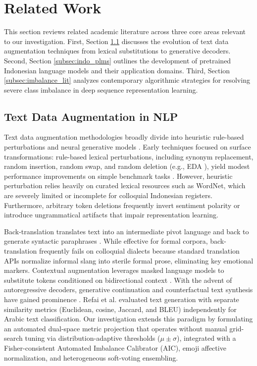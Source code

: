\documentclass{ieeeaccess}
\begin{document}
\section{Related Work}
\label{sec:related_work}

This section reviews related academic literature across three core areas relevant to our investigation. First, Section \ref{subsec:text_aug} discusses the evolution of text data augmentation techniques from lexical substitutions to generative decoders. Second, Section \ref{subsec:indo_plms} outlines the development of pretrained Indonesian language models and their application domains. Third, Section \ref{subsec:imbalance_lit} analyzes contemporary algorithmic strategies for resolving severe class imbalance in deep sequence representation learning.

\subsection{Text Data Augmentation in NLP}
\label{subsec:text_aug}

Text data augmentation methodologies broadly divide into heuristic rule-based perturbations and neural generative models \cite{feng2021survey, shorten2021text}. Early techniques focused on surface transformations: rule-based lexical perturbations, including synonym replacement, random insertion, random swap, and random deletion (e.g., EDA \cite{wei2019eda}), yield modest performance improvements on simple benchmark tasks \cite{feng2021survey}. However, heuristic perturbation relies heavily on curated lexical resources such as WordNet, which are severely limited or incomplete for colloquial Indonesian registers. Furthermore, arbitrary token deletions frequently invert sentiment polarity or introduce ungrammatical artifacts that impair representation learning.

Back-translation translates text into an intermediate pivot language and back to generate syntactic paraphrases \cite{feng2021survey, shorten2021text}. While effective for formal corpora, back-translation frequently fails on colloquial dialects because standard translation APIs normalize informal slang into sterile formal prose, eliminating key emotional markers. Contextual augmentation leverages masked language models to substitute tokens conditioned on bidirectional context \cite{kumar2020data, anaby2020not}. With the advent of autoregressive decoders, generative continuation and counterfactual text synthesis have gained prominence \cite{yoo2021gpt3mix, sahu2022data, refai2023data, dai2023augmenting, chen2021reinforced, moller2024parrot, ding2024gpt4}. Refai et al. \cite{refai2023data} evaluated text generation with separate similarity metrics (Euclidean, cosine, Jaccard, and BLEU) independently for Arabic text classification. Our investigation extends this paradigm by formulating an automated dual-space metric projection that operates without manual grid-search tuning via distribution-adaptive thresholds ($\mu \pm \sigma$), integrated with a Fisher-consistent Automated Imbalance Calibrator (AIC), emoji affective normalization, and heterogeneous soft-voting ensembling.
\end{document}
